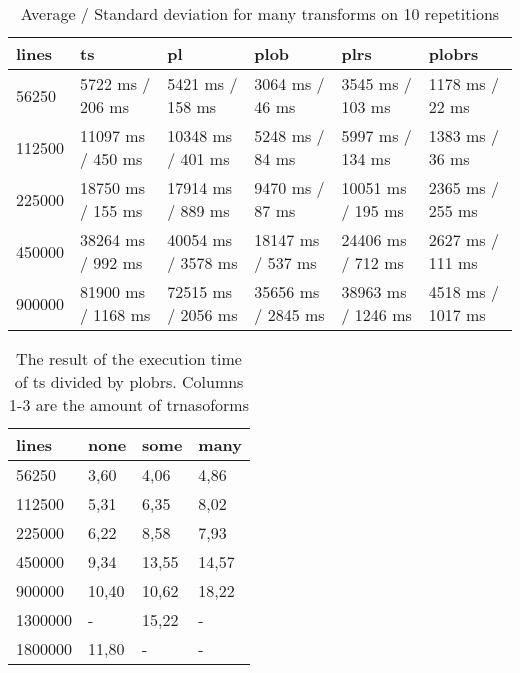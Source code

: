 \begin{table}[ht]
	\caption{Average / Standard deviation for many transforms on 10 repetitions}
	\label{tab:eval:many}
	\begin{tabular}{|l|l|l|l|l|l|}
		\hline
		lines  & ts                 & pl                 & plob               & plrs               & plobrs            \\
		\hline
		56250  & 5722 ms / 206 ms   & 5421 ms / 158 ms   & 3064 ms / 46 ms    & 3545 ms / 103 ms   & 1178 ms / 22 ms   \\
		112500 & 11097 ms / 450 ms  & 10348 ms / 401 ms  & 5248 ms / 84 ms    & 5997 ms / 134 ms   & 1383 ms / 36 ms   \\
		225000 & 18750 ms / 155 ms  & 17914 ms / 889 ms  & 9470 ms / 87 ms    & 10051 ms / 195 ms  & 2365 ms / 255 ms  \\
		450000 & 38264 ms / 992 ms  & 40054 ms / 3578 ms & 18147 ms / 537 ms  & 24406 ms / 712 ms  & 2627 ms / 111 ms  \\
		900000 & 81900 ms / 1168 ms & 72515 ms / 2056 ms & 35656 ms / 2845 ms & 38963 ms / 1246 ms & 4518 ms / 1017 ms \\
		\hline
	\end{tabular}
\end{table}

\begin{table}[ht]
	\caption{The result of the execution time of ts divided by plobrs. Columns 1-3 are the amount of trnasoforms}
	\label{tab:eval:ts_div_by_plobrs}
	\begin{tabular}{|l|l|l|l|}
		\hline
		lines   & none  & some  & many  \\
		\hline
		56250   & 3,60  & 4,06  & 4,86  \\
		112500  & 5,31  & 6,35  & 8,02  \\
		225000  & 6,22  & 8,58  & 7,93  \\
		450000  & 9,34  & 13,55 & 14,57 \\
		900000  & 10,40 & 10,62 & 18,22 \\
		1300000 & -     & 15,22 & -     \\
		1800000 & 11,80 & -     & -     \\
		\hline
	\end{tabular}
\end{table}







\pagebreak
